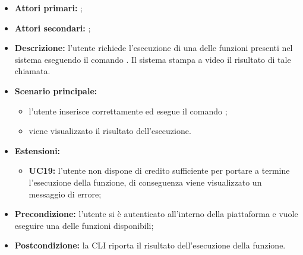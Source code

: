\begin{itemize}
	\item \textbf{Attori primari:} \ua{};
	\item \textbf{Attori secondari:} \re{};
	\item \textbf{Descrizione:} l’utente richiede l’esecuzione di una delle funzioni presenti nel sistema eseguendo il comando \prun{}. Il sistema stampa a video il risultato di tale chiamata. 
	\item \textbf{Scenario principale:} 
	\begin{itemize}
		\item l'utente inserisce correttamente ed esegue il comando \prun{}; 
		\item viene visualizzato il risultato dell’esecuzione. 
	\end{itemize}
	\item \textbf{Estensioni:} 
	\begin{itemize}
		\item \textbf{UC19:} l’utente non dispone di credito sufficiente per portare a termine l’esecuzione della funzione, di conseguenza viene visualizzato un messaggio di errore;
	\end{itemize}
	\item \textbf{Precondizione:} l’utente si è autenticato all’interno della piattaforma e vuole eseguire una delle funzioni disponibili;
	\item \textbf{Postcondizione:} la CLI riporta il risultato dell’esecuzione della funzione. 
\end{itemize}